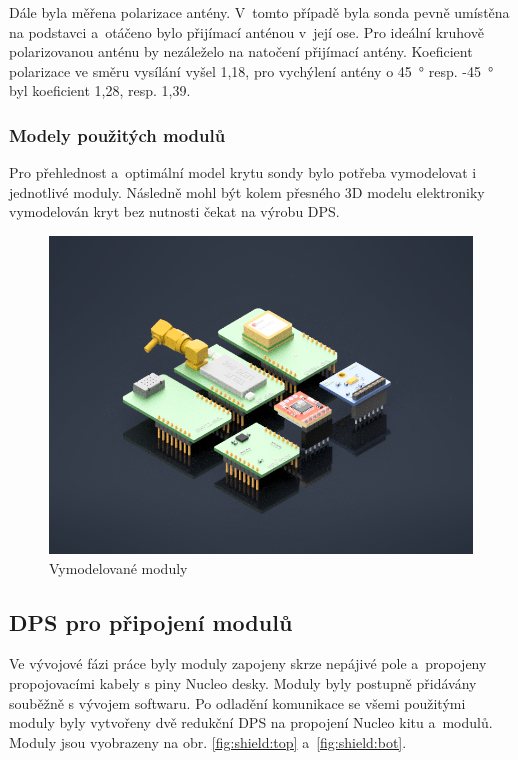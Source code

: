 \documentclass[twoside]{ctuthesis}
\theoremstyle{plain}
\theoremstyle{definition}
\theoremstyle{note}
\begin{document}
			Dále byla měřena polarizace antény. V~tomto případě byla sonda pevně umístěna na podstavci a~otáčeno bylo přijímací anténou v~její ose. Pro ideální kruhově polarizovanou anténu by nezáleželo na natočení přijímací antény. Koeficient polarizace ve směru vysílání vyšel 1,18, pro vychýlení antény o 45~° resp. -45~° byl koeficient 1,28, resp. 1,39.

			
			

			\subsubsection{Modely použitých modulů}
			Pro přehlednost a~optimální model krytu sondy bylo potřeba vymodelovat i jednotlivé moduly. Následně mohl být kolem přesného 3D modelu elektroniky vymodelován kryt bez nutnosti čekat na výrobu DPS.
			\begin{figure}[hbtp]
				\centering
				\includegraphics[width=.7\linewidth]{Figures/modules_assembly.png} 
				\caption{Vymodelované moduly}
				\label{fig:modules:assembly}
			\end{figure}
		

		
		\subsection{DPS pro připojení modulů}
		Ve vývojové fázi práce byly moduly zapojeny skrze nepájivé pole a~propojeny propojovacími kabely s piny Nucleo desky. Moduly byly postupně přidávány souběžně s vývojem softwaru. Po odladění komunikace se všemi použitými moduly byly vytvořeny dvě redukční DPS na propojení Nucleo kitu a~modulů. Moduly jsou vyobrazeny na obr. \ref{fig:shield:top} a~\ref{fig:shield:bot}. 
\end{document}
